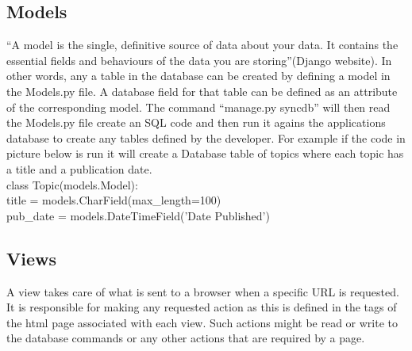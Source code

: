 \documentclass{l3proj}
\begin{document}
\subsection{Models}
``A model is the single, definitive source of data about your data. It contains the essential 
fields and behaviours of the data you are storing''(Django website). In other words, any a 
table in the database can be created by defining a model in the Models.py file. A 
database field for that table can be defined as an attribute of the corresponding model. 
The command ``manage.py syncdb'' will then read the Models.py file create an SQL code 
and then run it agains the applications database to create any tables defined by the 
developer. 
For example if the code in picture below is run it will create a Database table of topics 
where each topic has a title and a publication date. \\
class Topic(models.Model): \\
title = models.CharField(max\_length=100) \\
pub\_date = models.DateTimeField('Date Published')\\
\subsection{Views}
A view takes care of what is sent to a browser when a specific URL is requested. It is 
responsible for making any requested action as this is defined in the tags of the html 
page associated with each view. Such actions might be read or write to the database 
commands or any other actions that are required by a page.
\end{document}
